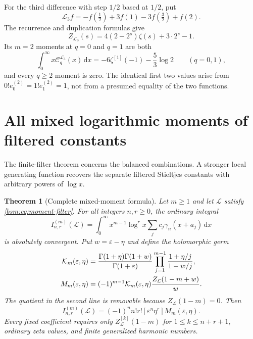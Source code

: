 \documentclass[11pt,letterpaper]{article}
\numberwithin{equation}{section}
\newtheorem{theorem}{Theorem}[section]
\theoremstyle{definition}\newtheorem{definition}[theorem]{Definition}
\theoremstyle{remark}\newtheorem{remark}[theorem]{Remark}
\newcommand{\dd}{\,\mathrm{d}}
\newcommand{\Ccal}{\mathcal C}
\newcommand{\Lcal}{\mathcal L}
\newcommand{\Kcal}{\mathcal K}
\newcommand{\eps}{\varepsilon}
\begin{document}
For the third difference with step $1/2$ based at $1/2$, put
\[
 \Lcal_3 f=-f(\tfrac12)+3f(1)-3f(\tfrac32)+f(2).
\]
The recurrence and duplication formulas give
\[
 Z_{\Lcal_3}(s)=4(2-2^s)\zeta(s)+3\cdot2^s-1.
\]
Its $m=2$ moments at $q=0$ and $q=1$ are both
\begin{equation}\label{bsm:eq:third-difference}
 \int_0^\infty x\Ccal_q^{\Lcal_3}(x)\dd x
       =-6\zeta^{[1]}(-1)-\frac53\log2\qquad(q=0,1),
\end{equation}
and every $q\ge2$ moment is zero. The identical first two values arise
from $0!e_0^{(2)}=1!e_1^{(2)}=1$, not from a presumed equality of
the two functions.

\section{All mixed logarithmic moments of filtered constants}\label{bsm:sec:mixed}

The finite-filter theorem concerns the balanced combinations. A stronger
local generating function recovers the separate filtered Stieltjes
constants with arbitrary powers of $\log x$.

\begin{theorem}[Complete mixed-moment formula]\label{bsm:thm:mixed}
Let $m\ge1$ and let $\Lcal$ satisfy \eqref{bsm:eq:moment-filter}.
For all integers $n,r\ge0$, the ordinary integral
\begin{equation}\label{bsm:eq:raw-moment}
 I_{n,r}^{(m)}(\Lcal)=
 \int_0^\infty x^{m-1}\log^r x
               \sum_j c_j\gamma_n(x+a_j)\dd x
\end{equation}
is absolutely convergent. Put $w=\eps-\eta$ and define the holomorphic
germ
\begin{align}\label{bsm:eq:K}
 \Kcal_m(\eps,\eta)
 &=\frac{\Gamma(1+\eta)\Gamma(1+w)}{\Gamma(1+\eps)}
       \prod_{j=1}^{m-1}\frac{1+\eta/j}{1-w/j},\notag\\
 M_m(\eps,\eta)
 &=(-1)^{m-1}\Kcal_m(\eps,\eta)
              \frac{Z_{\Lcal}(1-m+w)}w.
\end{align}
The quotient in the second line is removable because
$Z_{\Lcal}(1-m)=0$. Then
\begin{equation}\label{bsm:eq:mixed-coeff}
 \boxed{\displaystyle
 I_{n,r}^{(m)}(\Lcal)=
       (-1)^n n!r![\eps^n\eta^r]M_m(\eps,\eta).}
\end{equation}
Every fixed coefficient requires only
$Z_{\Lcal}^{[k]}(1-m)$ for $1\le k\le n+r+1$, ordinary zeta values,
and finite generalized harmonic numbers.
\end{theorem}
\end{document}
